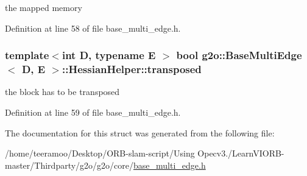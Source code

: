 the mapped memory 



Definition at line 58 of file base\+\_\+multi\+\_\+edge.\+h.

\subsubsection[{\texorpdfstring{transposed}{transposed}}]{\setlength{\rightskip}{0pt plus 5cm}template$<$int D, typename E $>$ bool {\bf g2o\+::\+Base\+Multi\+Edge}$<$ D, E $>$\+::Hessian\+Helper\+::transposed}\hypertarget{structg2o_1_1BaseMultiEdge_1_1HessianHelper_aeaff0227a982c30364d97ef9f0d9d60c}{}\label{structg2o_1_1BaseMultiEdge_1_1HessianHelper_aeaff0227a982c30364d97ef9f0d9d60c}


the block has to be transposed 



Definition at line 59 of file base\+\_\+multi\+\_\+edge.\+h.



The documentation for this struct was generated from the following file\+:\begin{DoxyCompactItemize}
\item 
/home/teeramoo/\+Desktop/\+O\+R\+B-\/slam-\/script/\+Using Opecv3./\+Learn\+V\+I\+O\+R\+B-\/master/\+Thirdparty/g2o/g2o/core/\hyperlink{base__multi__edge_8h}{base\+\_\+multi\+\_\+edge.\+h}\end{DoxyCompactItemize}
